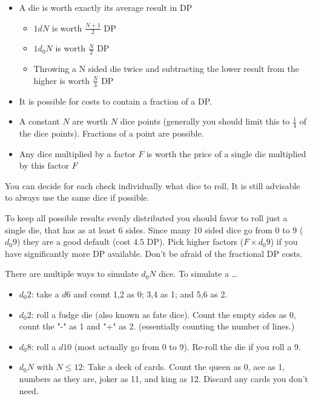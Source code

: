 \documentclass[11pt]{article}
\begin{document}
{\begin{short}
\begin{itemize}
\item A die is worth exactly its average result in DP
\begin{itemize}
\item \(1 d N\) is worth \(\frac{N+1}{2}\) DP
\item \(1 d_0 N\) is worth \(\frac{N}{2}\) DP
\item Throwing a N sided die twice and subtracting the lower result from the higher is worth \(\frac{N}{3}\) DP
\end{itemize}
\item It is possible for costs to contain a fraction of a DP.
\item A constant \(N\) are worth \(N\) dice points (generally you should limit this to \(\frac{1}{4}\) of the dice points). Fractions of a point are possible.
\item Any dice multiplied by a factor \(F\) is worth the price of a single die multiplied by this factor \(F\)
\end{itemize}

You can decide for each check individually what dice to roll, It is still advisable to always use the same dice if possible. 
\end{short}

To keep all possible results evenly distributed you should favor to roll just a single die, that has as at least 6 sides. Since many 10 sided dice go from 0 to 9 (\(d_0 9\)) they are a good default (cost \(4.5\) DP). Pick higher factors (\(F \times d_0 9\)) if you have significantly more DP available. Don't be afraid of the fractional DP costs. 

There are multiple ways to simulate \(d_0 N\) dice. To simulate a \ldots{}
\begin{itemize}
\item \(d_0 2\): take a \(d6\) and count 1,2 as 0; 3,4 as 1; and 5,6 as 2.
\item \(d_0 2\): roll a fudge die (also known as fate dice). Count the empty sides as 0, count the "-" as 1 and "+" as 2. (essentially counting the number of lines.)
\item \(d_0 8\): roll a \(d10\) (most actually go from 0 to 9). Re-roll the die if you roll a 9.
\item \(d_0 N\) with \(N \le 12\): Take a deck of cards. Count the queen as 0, ace as 1, numbers as they are, joker as 11, and king as 12. Discard any cards you don't need.
\end{itemize}

}
\end{document}
